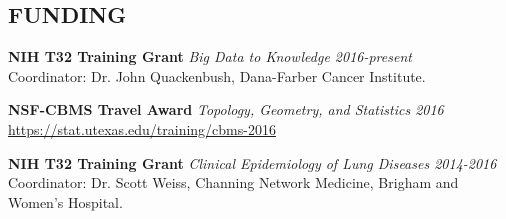 \documentclass[line, margin]{res}
\begin{document}
\begin{resume}


\section{FUNDING}
\textbf{NIH T32 Training Grant} \textit{Big Data to Knowledge \hfill 2016-present} \\
Coordinator: Dr. John Quackenbush, Dana-Farber Cancer Institute.

\textbf{NSF-CBMS Travel Award} \textit{Topology, Geometry, and Statistics \hfill 2016} \\
\url{https://stat.utexas.edu/training/cbms-2016}

\textbf{NIH T32 Training Grant} \textit{Clinical Epidemiology of Lung Diseases \hfill 2014-2016} \\
Coordinator: Dr. Scott Weiss, Channing Network Medicine, Brigham and Women's Hospital.


\end{resume}
\end{document}
